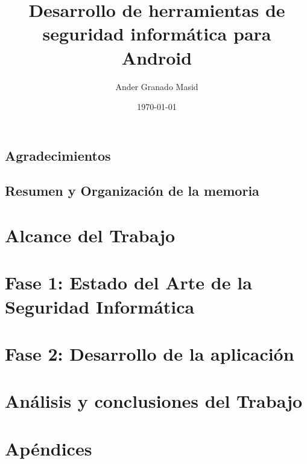 \documentclass[a4paper,12pt,twoside]{scrbook}
\title{Desarrollo de herramientas de seguridad informática para Android}
\author{Ander Granado Masid}
\date{\today}
\begin{document}
\frontmatter

\chapter{Agradecimientos}

\tableofcontents
\listoffigures
\listoftables
\chapter[Resumen]{Resumen y Organización de la memoria}



\mainmatter

\part{Alcance del Trabajo}



\part{Fase 1: Estado del Arte de la Seguridad Informática}





\part{Fase 2: Desarrollo de la aplicación}





\part{Análisis y conclusiones del Trabajo}

\part{Apéndices}



\backmatter

\printbibliography[heading=bibintoc]
\end{document}
